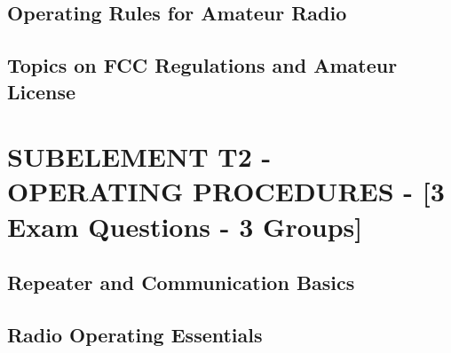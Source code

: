 \documentclass[12pt]{book}
\begin{document}
\section{Operating Rules for Amateur Radio}











\section{Topics on FCC Regulations and Amateur License}











\chapter{SUBELEMENT T2 - OPERATING PROCEDURES - [3 Exam Questions - 3 Groups]}
\section{Repeater and Communication Basics}












\section{Radio Operating Essentials}













\end{document}
